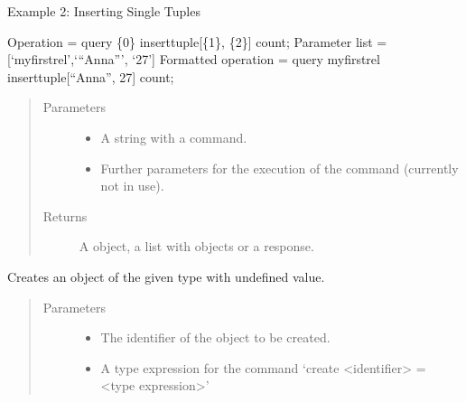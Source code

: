 \documentclass[letterpaper,10pt,english]{sphinxmanual}
\begin{document}
\begin{fulllineitems}
\begin{fulllineitems}
Example 2: Inserting Single Tuples

Operation = query \{0\} inserttuple{[}\{1\}, \{2\}{]} count;
Parameter list = {[}‘myfirstrel’,‘“Anna”’, ‘27’{]}
Formatted operation = query myfirstrel inserttuple{[}“Anna”, 27{]} count;
\begin{quote}\begin{description}
\item[{Parameters}] \leavevmode\begin{itemize}
\item {} 
 \textendash{} A string with a  command.

\item {} 
 \textendash{} Further parameters for the execution of the command (currently not in use).

\end{itemize}

\item[{Returns}] \leavevmode
A  object, a list with  objects or a  response.

\end{description}\end{quote}

\end{fulllineitems}


\begin{fulllineitems}
\label{\detokenize{index:secondodb.api.secondoapi.Cursor.execute_create}}
Creates an object of the given type with undefined value.
\begin{quote}\begin{description}
\item[{Parameters}] \leavevmode\begin{itemize}
\item {} 
 \textendash{} The identifier of the object to be created.

\item {} 
 \textendash{} A type expression for the command ‘create \textless{}identifier\textgreater{} = \textless{}type expression\textgreater{}’


\end{itemize}
\end{description}
\end{quote}
\end{fulllineitems}
\end{fulllineitems}
\end{document}
